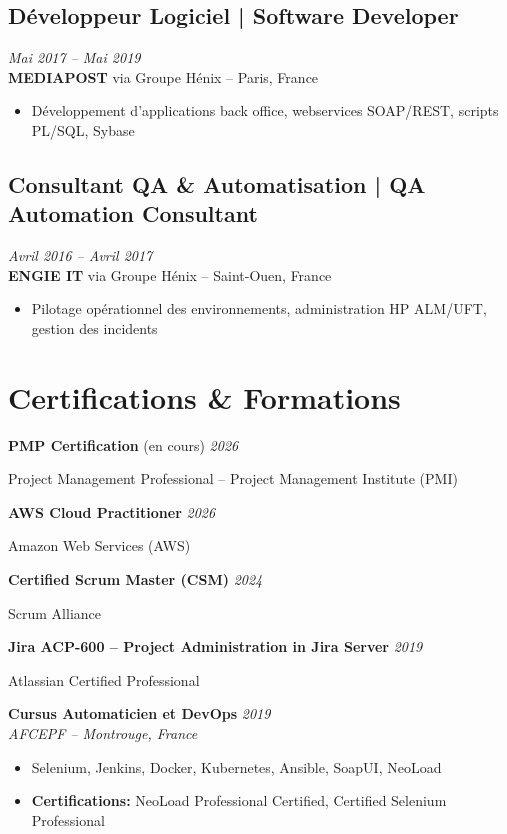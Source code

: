 \documentclass[11pt,a4paper]{article}
\begin{document}
\subsection*{Développeur Logiciel | Software Developer} \hfill \textit{Mai 2017 -- Mai 2019}\\
\textbf{MEDIAPOST} via Groupe Hénix -- Paris, France
\begin{itemize}
    \item Développement d'applications back office, webservices SOAP/REST, scripts PL/SQL, Sybase
\end{itemize}

\subsection*{Consultant QA \& Automatisation | QA Automation Consultant} \hfill \textit{Avril 2016 -- Avril 2017}\\
\textbf{ENGIE IT} via Groupe Hénix -- Saint-Ouen, France
\begin{itemize}
    \item Pilotage opérationnel des environnements, administration HP ALM/UFT, gestion des incidents
\end{itemize}

\section*{Certifications \& Formations}

\textbf{PMP Certification} (en cours) \hfill \textit{2026}

Project Management Professional -- Project Management Institute (PMI)

\textbf{AWS Cloud Practitioner} \hfill \textit{2026}

Amazon Web Services (AWS)

\textbf{Certified Scrum Master (CSM)} \hfill \textit{2024}

Scrum Alliance

\textbf{Jira ACP-600 -- Project Administration in Jira Server} \hfill \textit{2019}

Atlassian Certified Professional

\textbf{Cursus Automaticien et DevOps} \hfill \textit{2019}\\
\textit{AFCEPF -- Montrouge, France}
\begin{itemize}
    \item Selenium, Jenkins, Docker, Kubernetes, Ansible, SoapUI, NeoLoad
    \item \textbf{Certifications:} NeoLoad Professional Certified, Certified Selenium Professional
\end{itemize}
\end{document}
